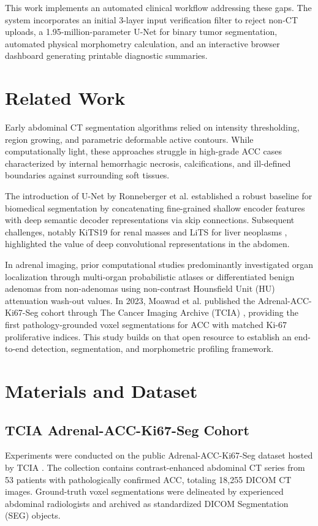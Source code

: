 \documentclass[conference]{IEEEtran}
\begin{document}
This work implements an automated clinical workflow addressing these gaps. The system incorporates an initial 3-layer input verification filter to reject non-CT uploads, a 1.95-million-parameter U-Net for binary tumor segmentation, automated physical morphometry calculation, and an interactive browser dashboard generating printable diagnostic summaries.

\section{Related Work}
Early abdominal CT segmentation algorithms relied on intensity thresholding, region growing, and parametric deformable active contours. While computationally light, these approaches struggle in high-grade ACC cases characterized by internal hemorrhagic necrosis, calcifications, and ill-defined boundaries against surrounding soft tissues.

The introduction of U-Net by Ronneberger et al. \cite{ronneberger2015} established a robust baseline for biomedical segmentation by concatenating fine-grained shallow encoder features with deep semantic decoder representations via skip connections. Subsequent challenges, notably KiTS19 for renal masses \cite{heller2021} and LiTS for liver neoplasms \cite{bilic2023}, highlighted the value of deep convolutional representations in the abdomen.

In adrenal imaging, prior computational studies predominantly investigated organ localization through multi-organ probabilistic atlases \cite{gibson2018} or differentiated benign adenomas from non-adenomas using non-contrast Hounsfield Unit (HU) attenuation wash-out values. In 2023, Moawad et al. published the Adrenal-ACC-Ki67-Seg cohort through The Cancer Imaging Archive (TCIA) \cite{moawad2023}, providing the first pathology-grounded voxel segmentations for ACC with matched Ki-67 proliferative indices. This study builds on that open resource to establish an end-to-end detection, segmentation, and morphometric profiling framework.

\section{Materials and Dataset}

\subsection{TCIA Adrenal-ACC-Ki67-Seg Cohort}
Experiments were conducted on the public Adrenal-ACC-Ki67-Seg dataset hosted by TCIA \cite{moawad2023}. The collection contains contrast-enhanced abdominal CT series from 53 patients with pathologically confirmed ACC, totaling 18,255 DICOM CT images. Ground-truth voxel segmentations were delineated by experienced abdominal radiologists and archived as standardized DICOM Segmentation (SEG) objects.
\end{document}
